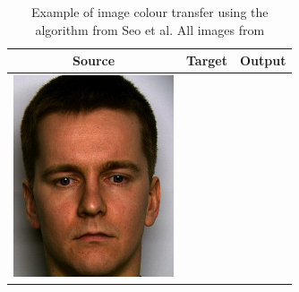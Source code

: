 \begin{table}[H]
    \centering
    \caption{Example of image colour transfer using the algorithm from Seo et al. All images from \cite{seo_2005_transfer} \label{tab:seo_demo}}
\begin{tabular}{|c|c|c|}
    \hline
    Source & Target & Output \\
    \hline
  \begin{minipage}{.29\textwidth}
    \includegraphics[width=\textwidth,height=\textheight,keepaspectratio]{images/seo_orig1}
  \end{minipage} & 
  \begin{minipage}{.29\textwidth}

\end{minipage}
\end{tabular}
\end{table}

